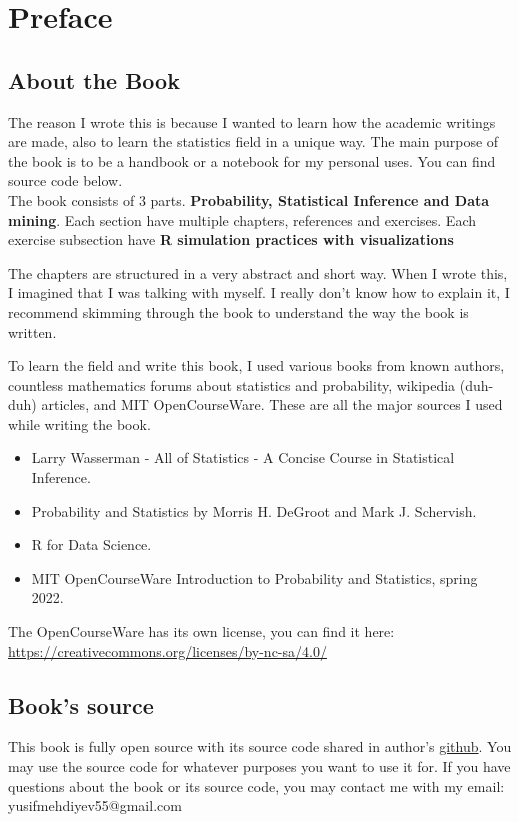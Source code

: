 \chapter*{Preface}

\section*{About the Book}
The reason I wrote this is because I wanted to learn how the academic writings are made, also to learn the statistics field in a unique way. The main purpose of the book is to be a handbook or a notebook for my personal uses. You can find source code below.\\
The book consists of $3$ parts. \textbf{Probability, Statistical Inference and Data mining}. Each section have multiple chapters, references and exercises. Each exercise subsection have \textbf{R simulation practices with visualizations}
\par
The chapters are structured in a very abstract and short way. When I wrote this, I imagined that I was talking with myself. I really don't know how to explain it, I recommend skimming through the book to understand the way the book is written.
\par
To learn the field and write this book, I used various books from known authors, countless mathematics forums about statistics and probability, wikipedia (duh-duh) articles, and MIT OpenCourseWare. These are all the major sources I used while writing the book.
\begin{itemize}
    \item Larry Wasserman - All of Statistics - A Concise Course in Statistical Inference.
    \item Probability and Statistics by Morris H. DeGroot and Mark J. Schervish.
    \item R for Data Science.
    \item MIT OpenCourseWare Introduction to Probability and Statistics, spring 2022.
\end{itemize}

The OpenCourseWare has its own license, you can find it here: \url{https://creativecommons.org/licenses/by-nc-sa/4.0/}


\section*{Book's source}
This book is fully open source with its source code shared in author's \href{https://github.com/JosephMehdiyev}{github}. You may use the source code for whatever purposes you want to use it for. If you have questions about the book or its source code, you may contact me with my email: yusifmehdiyev55@gmail.com 
